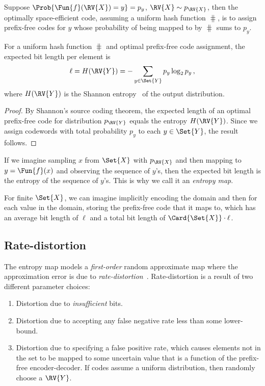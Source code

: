\documentclass[ ../main.tex]{subfiles}
\begin{document}
Suppose $\Prob{\Fun{f}(\RV{X}) = y} = p_y$, $\RV{X} \sim p_{\RV{X}}$, then the optimally space-efficient code, assuming a uniform hash function $\hash$, is to assign prefix-free codes for $y$ whose probability of being mapped to by $\hash$ sums to $p_y$.

\begin{theorem}
\label{thm:optimal-code}
For a uniform hash function $\hash$ and optimal prefix-free code assignment,
the expected bit length per element is
\begin{equation}
    \ell = H(\RV{Y}) = -\sum_{y \in \Set{Y}} p_y \log_2 p_y\,,
\end{equation}
where $H(\RV{Y})$ is the Shannon entropy~\cite{shannon1948} of the output distribution.
\end{theorem}
\begin{proof}
By Shannon's source coding theorem, the expected length
of an optimal prefix-free code for distribution $p_{\RV{Y}}$ equals the entropy
$H(\RV{Y})$. Since we assign codewords with total probability $p_y$ to each
$y \in \Set{Y}$, the result follows.
\end{proof}

If we imagine sampling $x$ from $\Set{X}$ with $p_{\RV{X}}$ and then mapping to
$y = \Fun{f}(x)$ and observing the sequence of $y$'s, then the expected bit length
is the entropy of the sequence of $y$'s. This is why we call it an
\emph{entropy map}.

For finite $\Set{X}$, we can imagine implicitly encoding the domain and
then for each value in the domain, storing the prefix-free code that it maps
to, which has an average bit length of $\ell$ and a total bit length of
$\Card{\Set{X}} \cdot \ell$.

\subsection{Rate-distortion}

The entropy map models a \emph{first-order} random approximate map where the approximation error is due to \emph{rate-distortion}~\cite{cover2006}.
Rate-distortion is a result of two different parameter choices:
\begin{enumerate}
	\item\label{itm:insufficient} Distortion due to \emph{insufficient} bits.
	\item\label{itm:fnr} Distortion due to accepting any false negative rate less than some lower-bound.
	\item Distortion due to specifying a false positive rate, which causes elements not in the set to be mapped to some uncertain value that is a function of the prefix-free encoder-decoder. If codes assume a uniform distribution, then randomly choose a $\RV{Y}$.
\end{enumerate}
\end{document}
